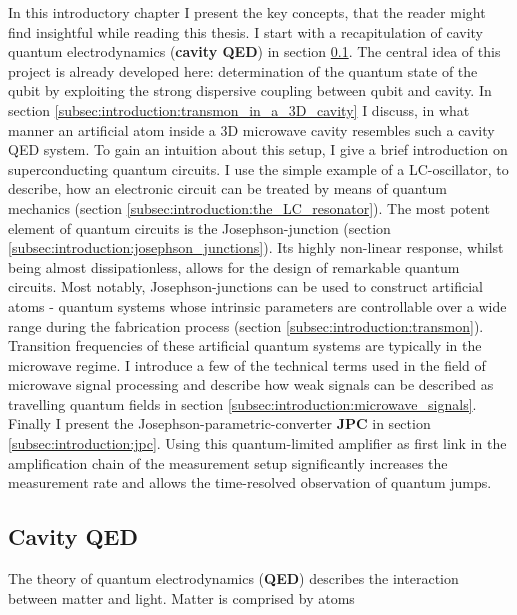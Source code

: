 In this introductory chapter I present the key concepts, that the reader might find insightful while reading this thesis. I start with a recapitulation of cavity quantum electrodynamics (\textbf{cavity QED}) in section \ref{subsec:introduction:cavity_QED}. The central idea of this project is already developed here: determination of the quantum state of the qubit by exploiting the strong dispersive coupling between qubit and cavity. In section \ref{subsec:introduction:transmon_in_a_3D_cavity} I discuss, in what manner an artificial atom inside a 3D microwave cavity resembles such a cavity QED system. To gain an intuition about this setup, I give a brief introduction on superconducting quantum circuits. I use the simple example of a LC-oscillator, to describe, how an electronic circuit can be treated by means of quantum mechanics (section \ref{subsec:introduction:the_LC_resonator}). The most potent element of quantum circuits is the Josephson-junction (section \ref{subsec:introduction:josephson_junctions}). Its highly non-linear response, whilst being almost dissipationless, allows for the design of remarkable quantum circuits. Most notably, Josephson-junctions can be used to construct artificial atoms - quantum systems whose intrinsic parameters are controllable over a wide range during the fabrication process (section \ref{subsec:introduction:transmon}). Transition frequencies of these artificial quantum systems are typically in the microwave regime.
I introduce a few of the technical terms used in the field of microwave signal processing and describe how weak signals can be described as travelling quantum fields in section \ref{subsec:introduction:microwave_signals}. Finally I present the Josephson-parametric-converter \textbf{JPC} in section \ref{subsec:introduction:jpc}. Using this quantum-limited amplifier as first link in the amplification chain of the measurement setup significantly increases the measurement rate and allows the time-resolved observation of quantum jumps.






\subsection{Cavity QED}
\label{subsec:introduction:cavity_QED}
\cite{haroche_cavity_qed}


The theory of quantum electrodynamics (\textbf{QED}) describes the interaction between matter and light. Matter is comprised by atoms 

